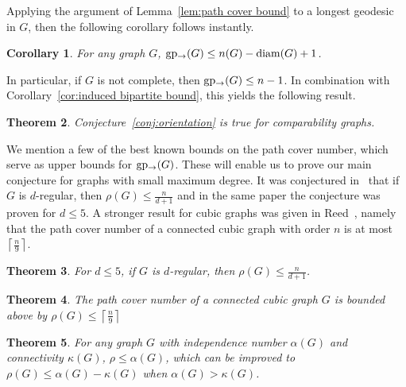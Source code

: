 \documentclass[a4paper,12pt]{article}
\newtheorem{theorem}{Theorem}[section]
\newtheorem{corollary}[theorem]{Corollary}
\theoremstyle{definition}
\newcommand{\diam}{{\rm diam}}
\newcommand{\lgp}{{\rm gp_{\rightarrow }}}
\begin{document}
	
	Applying the argument of Lemma~\ref{lem:path cover bound} to a longest geodesic in $G$, then the following corollary follows instantly.
	
	\begin{corollary}\label{cor:lgp vs diam}
		For any graph $G$, $\lgp (G) \leq n(G)-\diam (G)+1$.
	\end{corollary}
	
	In particular, if $G$ is not complete, then $\lgp (G) \leq n-1$. In combination with Corollary~\ref{cor:induced bipartite bound}, this yields the following result.
	
	\begin{theorem}\label{thm:conjecturetruecomparability}
		Conjecture~\ref{conj:orientation} is true for comparability graphs.
	\end{theorem}
	
	We mention a few of the best known bounds on the path cover number, which serve as upper bounds for $\lgp (G)$. These will enable us to prove our main conjecture for graphs with small maximum degree. It was conjectured in~\cite{Magnant} that if $G$ is $d$-regular, then $\rho (G) \leq \frac{n}{d+1}$ and in the same paper the conjecture was proven for $d \leq 5$. A stronger result for cubic graphs was given in Reed~\cite{Reed}, namely that the path cover number of a connected cubic graph with order $n$ is at most $\left \lceil \frac{n}{9} \right \rceil $.
	
	\begin{theorem}{\rm \cite{Magnant}}\label{thm:Magnant}
		For $d \leq 5$, if $G$ is $d$-regular, then $\rho (G) \leq \frac{n}{d+1}$.
	\end{theorem}
	
	\begin{theorem}{\rm \cite{Reed}}\label{thm:Reed}
		The path cover number of a connected cubic graph $G$ is bounded above by $\rho (G) \leq \left \lceil \frac{n}{9} \right \rceil $
	\end{theorem}
	
	\begin{theorem}{\rm \cite{Hartman}}
		For any graph $G$ with independence number $\alpha (G)$ and connectivity $\kappa (G)$, $\rho \leq \alpha (G)$, which can be improved to $\rho (G) \leq \alpha (G)-\kappa (G)$ when $\alpha (G) > \kappa (G)$.
	\end{theorem}
	
	
	
\end{document}
